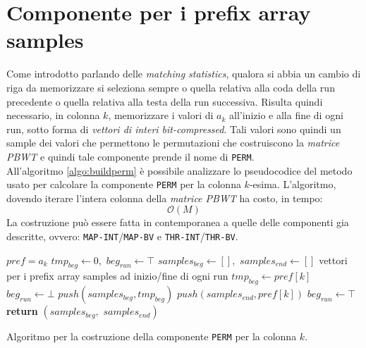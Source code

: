 \section{Componente per i prefix array samples}
Come introdotto parlando delle \textit{matching statistics}, qualora si abbia un
cambio di riga da memorizzare si seleziona sempre o quella relativa alla coda
della run precedente o quella relativa alla testa della run successiva. Risulta
quindi necessario, in colonna $k$, memorizzare i valori di $a_k$ all'inizio e
alla fine di ogni run, sotto forma di \textit{vettori di interi
  bit-compressed}. Tali valori sono quindi un sample dei valori che permettono
le permutazioni che costruiscono la \textit{matrice PBWT} e quindi tale
componente prende il nome di \texttt{PERM}.\\
All'algoritmo \ref{algo:buildperm} è possibile analizzare lo pseudocodice del
metodo usato per calcolare la componente \texttt{PERM} per la colonna
$k$-esima. L'algoritmo, dovendo iterare l'intera colonna della \textit{matrice
  PBWT} ha costo, in tempo:
\begin{equation}
  \label{eq:timeperm}
  \mathcal{O}(M)
\end{equation}
La costruzione può essere fatta in contemporanea a quelle delle componenti gia
descritte, ovvero: 
\texttt{MAP-INT}/\texttt{MAP-BV} e \texttt{THR-INT}/\texttt{THR-BV}.
\begin{algorithm}
  \begin{algorithmic}[1]
    \Comment $pref = a_k$
    \State $tmp_{beg}\gets 0,\,\,beg_{run}\gets \top$
    \State $samples_{beg} \gets [],\,\,samples_{end}\gets []$
    \Comment vettori per i prefix array samples ad inizio/fine di ogni run
    \For {\textit{every} $k\in\left[0,\,\, height\right)$}
    \State $tmp_{beg}\gets pref[k]$
    \State $beg_{run}\gets \bot$
    \EndIf
    \State $push(samples_{beg}, tmp_{beg})$
    \State $push(samples_{end}, pref[k])$
    \State $beg_{run}\gets \top$
    \EndIf
    \EndFor
    \State \textbf{return} $(samples_{beg},\,\, samples_{end})$  
    \EndFunction
  \end{algorithmic}
  \caption{{\footnotesize{Algoritmo per la costruzione della componente
  \texttt{PERM} per la colonna $k$.}}}
  \label{algo:buildperm}
\end{algorithm}
